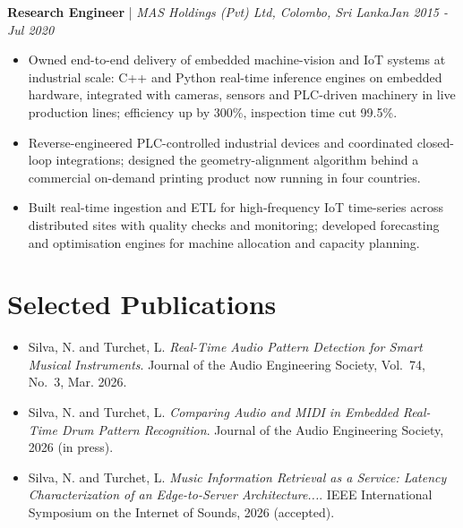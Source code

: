 \documentclass[11pt]{article}
\newenvironment{cvrole}[5]{%
  \par\noindent\textbf{\large #1} | \textit{\small #2, #3}\hfill \textit{\small #4 - #5}\par
  \begin{itemize}[leftmargin=2em, itemsep=-0.3em, topsep=-0.5em]%
}{%
  \end{itemize}\par\noindent\mbox{}\par\vspace{0.1em}%
}
\begin{document}
\begin{cvrole}{Research Engineer}{MAS Holdings (Pvt) Ltd}{Colombo, Sri Lanka}{Jan 2015}{Jul 2020}
    \item Owned end-to-end delivery of embedded machine-vision and IoT systems at industrial scale: C++ and Python real-time inference engines on embedded hardware, integrated with cameras, sensors and PLC-driven machinery in live production lines; efficiency up by 300\%, inspection time cut 99.5\%.
    \item Reverse-engineered PLC-controlled industrial devices and coordinated closed-loop integrations; designed the geometry-alignment algorithm behind a commercial on-demand printing product now running in four countries.
    \item Built real-time ingestion and ETL for high-frequency IoT time-series across distributed sites with quality checks and monitoring; developed forecasting and optimisation engines for machine allocation and capacity planning.
\end{cvrole}



 
\section*{Selected Publications \footnotesize {}}
\begin{itemize}[leftmargin=1.2em, itemsep=-0.25em]
    \item Silva, N. and Turchet, L. \textit{Real-Time Audio Pattern Detection for Smart Musical Instruments}. Journal of the Audio Engineering Society, Vol.~74, No.~3, Mar. 2026. 
    \item Silva, N. and Turchet, L. \textit{Comparing Audio and MIDI in Embedded Real-Time Drum Pattern Recognition}. Journal of the Audio Engineering Society, 2026 (in press).
    \item Silva, N. and Turchet, L. \textit{Music Information Retrieval as a Service: Latency Characterization of an Edge-to-Server Architecture...}. IEEE International Symposium on the Internet of Sounds, 2026 (accepted).
\end{itemize}
 
\end{document}
